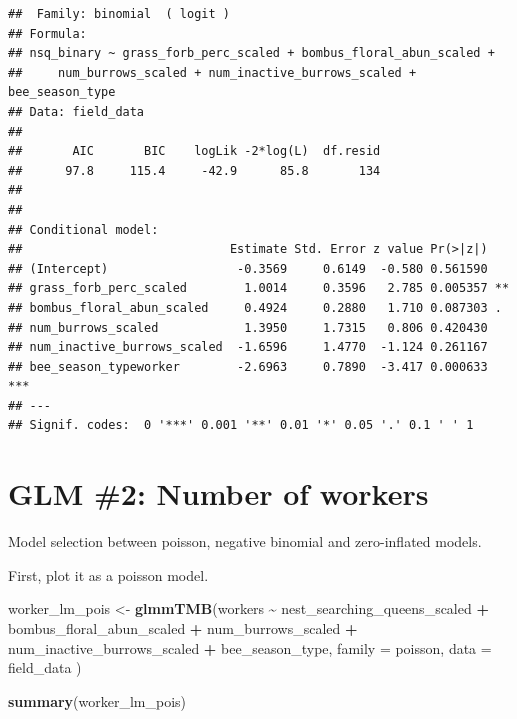 \documentclass[
]{article}
\newenvironment{Shaded}{\begin{snugshade}}{\end{snugshade}}
\newcommand{\AttributeTok}[1]{\textcolor[rgb]{0.13,0.29,0.53}{#1}}
\newcommand{\FunctionTok}[1]{\textcolor[rgb]{0.13,0.29,0.53}{\textbf{#1}}}
\newcommand{\NormalTok}[1]{#1}
\newcommand{\OtherTok}[1]{\textcolor[rgb]{0.56,0.35,0.01}{#1}}
\newcommand{\SpecialCharTok}[1]{\textcolor[rgb]{0.81,0.36,0.00}{\textbf{#1}}}
\begin{document}
\begin{verbatim}
##  Family: binomial  ( logit )
## Formula:          
## nsq_binary ~ grass_forb_perc_scaled + bombus_floral_abun_scaled +  
##     num_burrows_scaled + num_inactive_burrows_scaled + bee_season_type
## Data: field_data
## 
##       AIC       BIC    logLik -2*log(L)  df.resid 
##      97.8     115.4     -42.9      85.8       134 
## 
## 
## Conditional model:
##                             Estimate Std. Error z value Pr(>|z|)    
## (Intercept)                  -0.3569     0.6149  -0.580 0.561590    
## grass_forb_perc_scaled        1.0014     0.3596   2.785 0.005357 ** 
## bombus_floral_abun_scaled     0.4924     0.2880   1.710 0.087303 .  
## num_burrows_scaled            1.3950     1.7315   0.806 0.420430    
## num_inactive_burrows_scaled  -1.6596     1.4770  -1.124 0.261167    
## bee_season_typeworker        -2.6963     0.7890  -3.417 0.000633 ***
## ---
## Signif. codes:  0 '***' 0.001 '**' 0.01 '*' 0.05 '.' 0.1 ' ' 1
\end{verbatim}

\section{GLM \#2: Number of workers}\label{glm-2-number-of-workers}

Model selection between poisson, negative binomial and zero-inflated
models.

First, plot it as a poisson model.

\begin{Shaded}
\begin{Highlighting}[]
\NormalTok{worker\_lm\_pois }\OtherTok{\textless{}{-}} \FunctionTok{glmmTMB}\NormalTok{(workers }\SpecialCharTok{\textasciitilde{}}\NormalTok{ nest\_searching\_queens\_scaled }\SpecialCharTok{+}
\NormalTok{                       bombus\_floral\_abun\_scaled }\SpecialCharTok{+} 
\NormalTok{                       num\_burrows\_scaled }\SpecialCharTok{+} 
\NormalTok{                       num\_inactive\_burrows\_scaled }\SpecialCharTok{+}
\NormalTok{                       bee\_season\_type, }
                     \AttributeTok{family =}\NormalTok{ poisson,}
                     \AttributeTok{data =}\NormalTok{ field\_data}
\NormalTok{                       )}

\FunctionTok{summary}\NormalTok{(worker\_lm\_pois)}
\end{Highlighting}
\end{Shaded}
\end{document}
